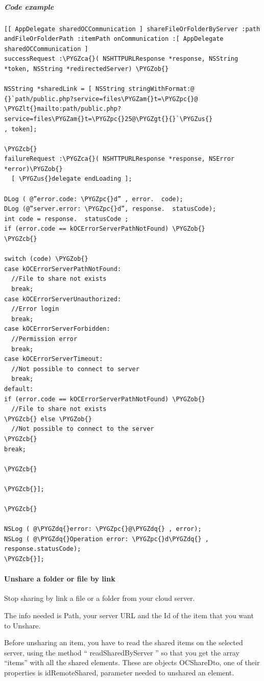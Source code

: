 \documentclass[letterpaper,10pt,english]{sphinxmanual}
\def\PYGZus{\char`\_}
\def\PYGZob{\char`\{}
\def\PYGZcb{\char`\}}
\def\PYGZca{\char`\^}
\def\PYGZam{\char`\&}
\def\PYGZlt{\char`\<}
\def\PYGZgt{\char`\>}
\def\PYGZpc{\char`\%}
\def\PYGZdq{\char`\"}
\begin{document}
\subparagraph{Code example}
\label{ios_library/examples:id18}
\begin{Verbatim}[commandchars=\\\{\}]
[[ AppDelegate sharedOCCommunication ] shareFileOrFolderByServer :path andFileOrFolderPath :itemPath onCommunication :[ AppDelegate sharedOCCommunication ]
successRequest :\PYGZca{}( NSHTTPURLResponse *response, NSString *token, NSString *redirectedServer) \PYGZob{}

NSString *sharedLink = [ NSString stringWithFormat:@ {}`path/public.php?service=files\PYGZam{}t=\PYGZpc{}@ \PYGZlt{}mailto:path/public.php?service=files\PYGZam{}t=\PYGZpc{}25@\PYGZgt{}{}`\PYGZus{}
, token];

\PYGZcb{}
failureRequest :\PYGZca{}( NSHTTPURLResponse *response, NSError *error)\PYGZob{}
  [ \PYGZus{}delegate endLoading ];

DLog ( @”error.code: \PYGZpc{}d” , error.  code);
DLog (@”server.error: \PYGZpc{}d”, response.  statusCode);
int code = response.  statusCode ;
if (error.code == kOCErrorServerPathNotFound) \PYGZob{}
\PYGZcb{}

switch (code) \PYGZob{}
case kOCErrorServerPathNotFound:
  //File to share not exists
  break;
case kOCErrorServerUnauthorized:
  //Error login
  break;
case kOCErrorServerForbidden:
  //Permission error
  break;
case kOCErrorServerTimeout:
  //Not possible to connect to server
  break;
default:
if (error.code == kOCErrorServerPathNotFound) \PYGZob{}
  //File to share not exists
\PYGZcb{} else \PYGZob{}
  //Not possible to connect to the server
\PYGZcb{}
break;

\PYGZcb{}

\PYGZcb{}];

\PYGZcb{}

NSLog ( @\PYGZdq{}error: \PYGZpc{}@\PYGZdq{} , error);
NSLog ( @\PYGZdq{}Operation error: \PYGZpc{}d\PYGZdq{} , response.statusCode);
\PYGZcb{}];
\end{Verbatim}


\paragraph{Unshare a folder or file by link}
\label{ios_library/examples:unshare-a-folder-or-file-by-link}
Stop sharing by link a file or a folder from your cloud server.

The info needed is Path, your server URL and the Id of the item that you want
to Unshare.

Before unsharing an item, you have to read the shared items on the selected
server, using the method “ readSharedByServer ” so that you get the array
“items” with all the shared elements.  These are objects OCShareDto, one of
their properties is idRemoteShared, parameter needed to unshared an element.
\end{document}

